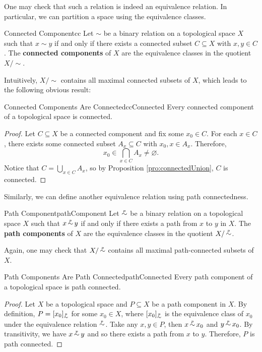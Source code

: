 \documentclass[math]{amznotes}
\theoremstyle{remark}
\newcommand{\psim}{\mathop{\mathrel{\accentset{p}{\sim}}}}
\begin{document}
One may check that such a relation is indeed an equivalence relation. In particular, we can partition a space using the equivalence classes.
\begin{dfnbox}{Connected Component}{cc}
    Let $\sim$ be a binary relation on a topological space $X$ such that $x \sim y$ if and only if there exists a connected subset $C \subseteq X$ with $x, y \in C$. The {\color{red} \textbf{connected components}} of $X$ are the equivalence classes in the quotient $X \slash\sim$.
\end{dfnbox}
Intuitively, $X \slash \sim$ contains all maximal connected subsets of $X$, which leads to the following obvious result:
\begin{probox}{Connected Components Are Connected}{ccConnected}
    Every connected component of a topological space is connected.
    \tcblower
    \begin{proof}
        Let $C \subseteq X$ be a connected component and fix some $x_0 \in C$. For each $x \in C$, there exists some connected subset $A_x \subseteq C$ with $x_0, x \in A_x$. Therefore, 
        \begin{equation*}
            x_0 \in \bigcap_{x \in C}A_x \neq \varnothing.
        \end{equation*}
        Notice that $C = \bigcup_{x \in C}A_x$, so by Proposition \ref{pro:connectedUnion}, $C$ is connected.
    \end{proof}
\end{probox}
Similarly, we can define another equivalence relation using path connectedness.
\begin{dfnbox}{Path Component}{pathComponent}
    Let $\psim$ be a binary relation on a topological space $X$ such that $x \psim y$ if and only if there exists a path from $x$ to $y$ in $X$. The {\color{red} \textbf{path components}} of $X$ are the equivalence classes in the quotient $X \slash\psim$.
\end{dfnbox}
Again, one may check that $X \slash\psim$ contains all maximal path-connected subsets of $X$.
\begin{probox}{Path Components Are Path Connected}{pathConnected}
    Every path component of a topological space is path connected.
    \tcblower
    \begin{proof}
        Let $X$ be a topological space and $P \subseteq X$ be a path component in $X$. By definition, $P = \left[x_0\right]_{\psim}$ for some $x_0 \in X$, where $\left[x_0\right]_{\psim}$ is the equivalence class of $x_0$ under the equivalence relation $\psim$. Take any $x, y \in P$, then $x \psim x_0$ and $y \psim x_0$. By transitivity, we have $x \psim y$ and so there exists a path from $x$ to $y$. Therefore, $P$ is path connected. 
    \end{proof}
\end{probox}
\end{document}
